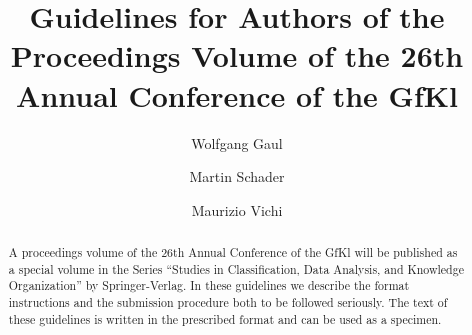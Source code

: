 \documentclass[runningheads]{d:/latex/gfkl2002}
\begin{document}
%
\title*{Guidelines for Authors of the\protect\linebreak  
Proceedings Volume of the\protect\linebreak  
26th Annual Conference of the GfKl
}

%

%

%  
\author{
  Wolfgang Gaul
  \and 
  Martin Schader
  \and 
  Maurizio Vichi
}

%

%

\maketitle             

\begin{abstract}
A proceedings volume of the 26th Annual Conference of the GfKl will be published 
as a special volume in the Series ``Studies in Classification, Data Analysis, 
and Knowledge Organization'' by Springer-Verlag.
In these guidelines we describe the format instructions and the submission 
procedure both to be followed seriously. The text of these guidelines is 
written in the prescribed format and can be used as a specimen.
\end{abstract}
\end{document}
